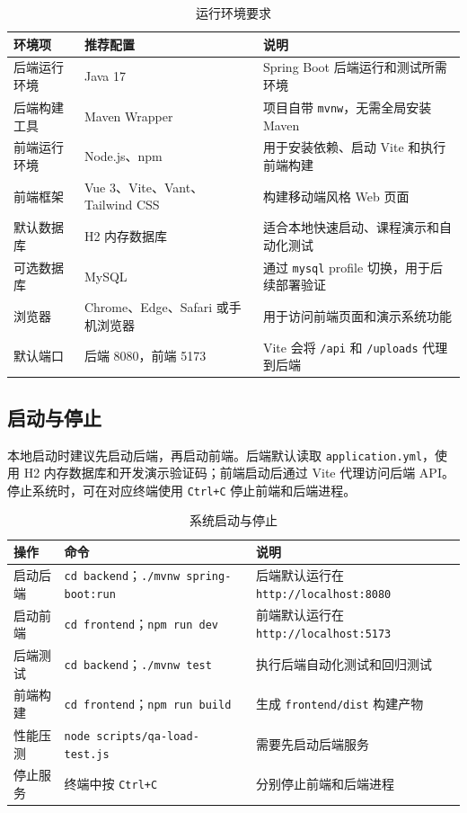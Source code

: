 ﻿\documentclass[UTF8,a4paper,12pt]{ctexart}
\begin{document}
\begin{table}[H]
  \centering
  \caption{运行环境要求}
  \begin{tabular}{p{3.2cm}p{4.2cm}p{5.8cm}}
    \toprule
    环境项 & 推荐配置 & 说明 \\
    \midrule
    后端运行环境 & Java 17 & Spring Boot 后端运行和测试所需环境 \\
    后端构建工具 & Maven Wrapper & 项目自带 \texttt{mvnw}，无需全局安装 Maven \\
    前端运行环境 & Node.js、npm & 用于安装依赖、启动 Vite 和执行前端构建 \\
    前端框架 & Vue 3、Vite、Vant、Tailwind CSS & 构建移动端风格 Web 页面 \\
    默认数据库 & H2 内存数据库 & 适合本地快速启动、课程演示和自动化测试 \\
    可选数据库 & MySQL & 通过 \texttt{mysql} profile 切换，用于后续部署验证 \\
    浏览器 & Chrome、Edge、Safari 或手机浏览器 & 用于访问前端页面和演示系统功能 \\
    默认端口 & 后端 8080，前端 5173 & Vite 会将 \texttt{/api} 和 \texttt{/uploads} 代理到后端 \\
    \bottomrule
  \end{tabular}
\end{table}

\subsection{启动与停止}
本地启动时建议先启动后端，再启动前端。后端默认读取 \texttt{application.yml}，使用 H2 内存数据库和开发演示验证码；前端启动后通过 Vite 代理访问后端 API。停止系统时，可在对应终端使用 \texttt{Ctrl+C} 停止前端和后端进程。

\begin{table}[H]
  \centering
  \caption{系统启动与停止}
  \begin{tabular}{p{3.2cm}p{5.5cm}p{4.5cm}}
    \toprule
    操作 & 命令 & 说明 \\
    \midrule
    启动后端 & \texttt{cd backend}；\texttt{./mvnw spring-boot:run} & 后端默认运行在 \texttt{http://localhost:8080} \\
    启动前端 & \texttt{cd frontend}；\texttt{npm run dev} & 前端默认运行在 \texttt{http://localhost:5173} \\
    后端测试 & \texttt{cd backend}；\texttt{./mvnw test} & 执行后端自动化测试和回归测试 \\
    前端构建 & \texttt{cd frontend}；\texttt{npm run build} & 生成 \texttt{frontend/dist} 构建产物 \\
    性能压测 & \texttt{node scripts/qa-load-test.js} & 需要先启动后端服务 \\
    停止服务 & 终端中按 \texttt{Ctrl+C} & 分别停止前端和后端进程 \\
    \bottomrule
  \end{tabular}
\end{table}
\end{document}
